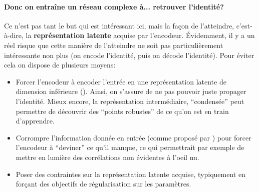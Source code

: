 \documentclass[a4paper, 11pt, onecolumn]{article}
\begin{document}
\paragraph{Donc on entraîne un réseau complexe à... retrouver l'identité?}

Ce n'est pas tant le but qui est intéressant ici, mais la façon de l'atteindre,
c'est-à-dire, la \textbf{représentation latente} acquise par l'encodeur.
Évidemment, il y a un réel risque que cette manière de l'atteindre ne soit pas
particulièrement intéressante non plus (on encode l'identité, puis on décode
l'identité). Pour éviter cela on dispose de plusieurs moyens:

\begin{itemize}
\item Forcer l'encodeur à encoder l'entrée en une représentation latente
  de dimension inférieure (\cite{hinton2006reducing}). Ainsi, on s'assure de ne pas pouvoir juste propager
  l'identité. Mieux encore, la représentation intermédiaire, ``condensée'' peut
  permettre de découvrir des ``points robustes'' de ce qu'on est en train
  d'apprendre.
\item Corrompre l'information donnée en entrée (comme proposé par
  \cite{Vincent:2008:ECR:1390156.1390294}) pour forcer l'encodeur à
  ``deviner'' ce qu'il manque, ce qui permettrait par exemple de mettre en
  lumière des corrélations non évidentes à l'oeil nu.
\item Poser des contraintes sur la représentation latente acquise,
  typiquement en forçant des objectifs de régularisation sur les paramètres.
\end{itemize}
\end{document}
